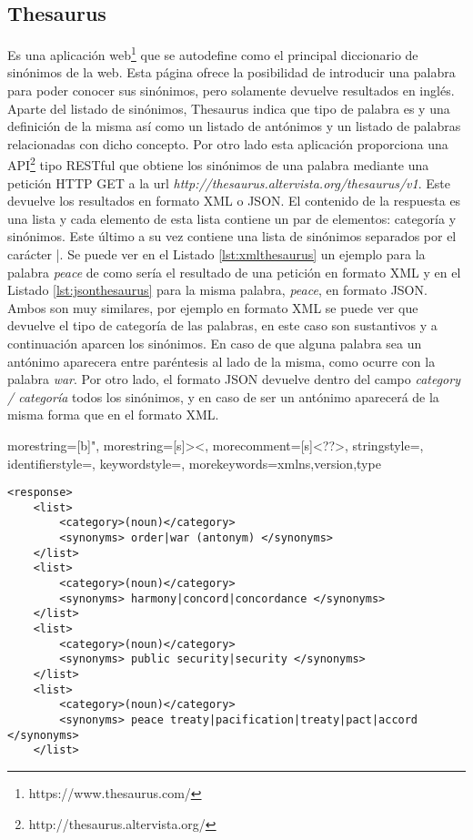 \subsection{Thesaurus}
\label{cap:subsec:thesaurus}
Es una aplicación web\footnote{https://www.thesaurus.com/} que se autodefine como el principal diccionario de sinónimos de la web. Esta página ofrece la posibilidad de introducir una palabra para poder conocer sus sinónimos, pero solamente devuelve resultados en inglés. Aparte del listado de sinónimos, Thesaurus indica que tipo de palabra es y una definición de la misma así como un listado de antónimos y un listado de palabras relacionadas con dicho concepto. 
Por otro lado esta aplicación proporciona una API\footnote{http://thesaurus.altervista.org/} tipo RESTful que obtiene los sinónimos de una palabra mediante una petición HTTP GET a la url \textit{http://thesaurus.altervista.org/thesaurus/v1}. 
Este devuelve los resultados en formato XML o JSON. El contenido de la respuesta es una lista y cada elemento de esta lista contiene un par de elementos: categoría y sinónimos. Este último a su vez contiene una lista de sinónimos separados por el carácter |. 
Se puede ver en el Listado \ref{lst:xmlthesaurus} un ejemplo para la palabra \textit{peace} de como sería el resultado de una petición en formato XML y en el Listado \ref{lst:jsonthesaurus} para la misma palabra, \textit{peace}, en formato JSON.
Ambos son muy similares, por ejemplo en formato XML se puede ver que devuelve el tipo de categoría de las palabras, en este caso son sustantivos y a continuación aparcen los sinónimos. En caso de que alguna palabra sea un antónimo aparecera entre paréntesis al lado de la misma, como ocurre con la palabra \textit{war}. Por otro lado, el formato JSON devuelve dentro del campo \textit{category / categoría} todos los sinónimos, y en caso de ser un antónimo aparecerá de la misma forma que en el formato XML.






{
	morestring=[b]",
	morestring=[s]{>}{<},
	morecomment=[s]{<?}{?>},
	stringstyle=\color{black},
	identifierstyle=\color{darkblue},
	keywordstyle=\color{cyan},
	morekeywords={xmlns,version,type}%
}



\lstset{language=XML}
\begin{lstlisting}[caption= Ejemplo de salida de Thesaurus en formato XML para la palabra \textit{peace}, label={lst:xmlthesaurus}, frame=single]
<response> 
	<list>
		<category>(noun)</category> 
		<synonyms> order|war (antonym) </synonyms>
	</list>
	<list>
		<category>(noun)</category> 
		<synonyms> harmony|concord|concordance </synonyms>
	</list>
	<list>
		<category>(noun)</category> 
		<synonyms> public security|security </synonyms>
	</list>
	<list>
		<category>(noun)</category> 
		<synonyms> peace treaty|pacification|treaty|pact|accord </synonyms>
	</list>
\end{lstlisting}





